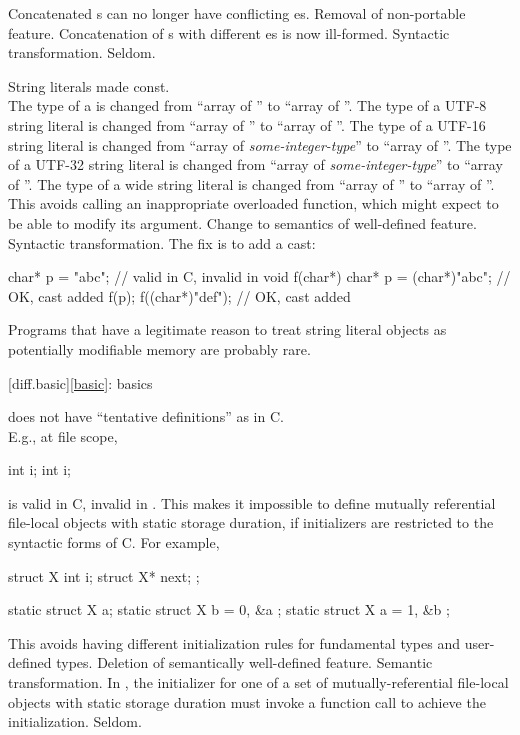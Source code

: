\change
Concatenated s can no longer have
conflicting es.
\rationale
Removal of non-portable feature.
\effect
Concatenation of s
with different es
is now ill-formed.
\difficulty
Syntactic transformation.
\howwide
Seldom.

\change
String literals made const.\\
The type of a  is changed
from ``array of ''
to ``array of ''.
%
The type of a UTF-8 string literal is changed
from ``array of ''
to ``array of ''.
%
The type of a UTF-16 string literal is changed
from ``array of \textit{some-integer-type}''
to ``array of ''.
%
The type of a UTF-32 string literal is changed
from ``array of \textit{some-integer-type}''
to ``array of ''.
The type of a wide string literal is changed
from ``array of ''
to ``array of ''.
\rationale
This avoids calling an inappropriate overloaded function,
which might expect to be able to modify its argument.
\effect
Change to semantics of well-defined feature.
\difficulty
Syntactic transformation. The fix is to add a cast:
\begin{codeblock}
char* p = "abc";                // valid in C, invalid in \Cpp{}
void f(char*) {
  char* p = (char*)"abc";       // OK, cast added
  f(p);
  f((char*)"def");              // OK, cast added
}
\end{codeblock}
\howwide
Programs that have a legitimate reason to treat string literal objects
as potentially modifiable memory are probably rare.

[diff.basic]{\ref{basic}: basics}

\change
\Cpp{} does not have ``tentative definitions'' as in C.\\
E.g., at file scope,
\begin{codeblock}
int i;
int i;
\end{codeblock}
is valid in C, invalid in \Cpp{}.
This makes it impossible to define
mutually referential file-local objects with static storage duration,
if initializers are restricted to the syntactic forms of C\@.
For example,
\begin{codeblock}
struct X { int i; struct X* next; };

static struct X a;
static struct X b = { 0, &a };
static struct X a = { 1, &b };
\end{codeblock}
\rationale
This avoids having different initialization rules for
fundamental types and user-defined types.
\effect
Deletion of semantically well-defined feature.
\difficulty
Semantic transformation.
In \Cpp{}, the initializer for one of a set of
mutually-referential file-local objects with static storage
duration must invoke a function
call to achieve the initialization.
\howwide
Seldom.

